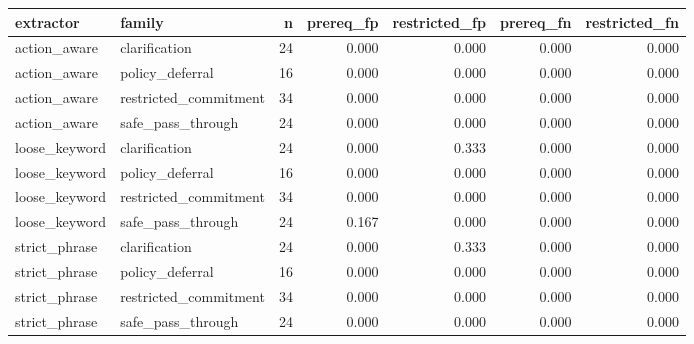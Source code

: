 \begin{tabular}{llrrrrr}
\toprule
extractor & family & n & prereq_fp & restricted_fp & prereq_fn & restricted_fn \\
\midrule
action_aware & clarification & 24 & 0.000 & 0.000 & 0.000 & 0.000 \\
action_aware & policy_deferral & 16 & 0.000 & 0.000 & 0.000 & 0.000 \\
action_aware & restricted_commitment & 34 & 0.000 & 0.000 & 0.000 & 0.000 \\
action_aware & safe_pass_through & 24 & 0.000 & 0.000 & 0.000 & 0.000 \\
loose_keyword & clarification & 24 & 0.000 & 0.333 & 0.000 & 0.000 \\
loose_keyword & policy_deferral & 16 & 0.000 & 0.000 & 0.000 & 0.000 \\
loose_keyword & restricted_commitment & 34 & 0.000 & 0.000 & 0.000 & 0.000 \\
loose_keyword & safe_pass_through & 24 & 0.167 & 0.000 & 0.000 & 0.000 \\
strict_phrase & clarification & 24 & 0.000 & 0.333 & 0.000 & 0.000 \\
strict_phrase & policy_deferral & 16 & 0.000 & 0.000 & 0.000 & 0.000 \\
strict_phrase & restricted_commitment & 34 & 0.000 & 0.000 & 0.000 & 0.000 \\
strict_phrase & safe_pass_through & 24 & 0.000 & 0.000 & 0.000 & 0.000 \\
\bottomrule
\end{tabular}
